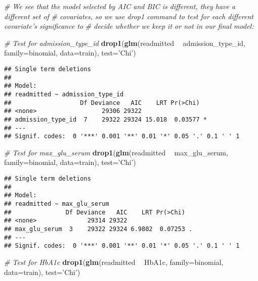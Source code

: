 \documentclass[
]{article}
\newenvironment{Shaded}{\begin{snugshade}}{\end{snugshade}}
\newcommand{\CommentTok}[1]{\textcolor[rgb]{0.56,0.35,0.01}{\textit{#1}}}
\newcommand{\DataTypeTok}[1]{\textcolor[rgb]{0.13,0.29,0.53}{#1}}
\newcommand{\KeywordTok}[1]{\textcolor[rgb]{0.13,0.29,0.53}{\textbf{#1}}}
\newcommand{\NormalTok}[1]{#1}
\newcommand{\OperatorTok}[1]{\textcolor[rgb]{0.81,0.36,0.00}{\textbf{#1}}}
\newcommand{\StringTok}[1]{\textcolor[rgb]{0.31,0.60,0.02}{#1}}
\begin{document}
\begin{Shaded}
\begin{Highlighting}[]
\CommentTok{# We see that the model selected by AIC and BIC is different, they have a different set of }
\CommentTok{# covariates, so we use drop1 command to test for each different covariate's significance to}
\CommentTok{# decide whether we keep it or not in our final model:}

\CommentTok{# Test for admission_type_id}
\KeywordTok{drop1}\NormalTok{(}\KeywordTok{glm}\NormalTok{(readmitted }\OperatorTok{~}\StringTok{ }\NormalTok{admission_type_id, }\DataTypeTok{family=}\NormalTok{binomial, }\DataTypeTok{data=}\NormalTok{train), }\DataTypeTok{test=}\StringTok{'Chi'}\NormalTok{)}
\end{Highlighting}
\end{Shaded}

\begin{verbatim}
## Single term deletions
## 
## Model:
## readmitted ~ admission_type_id
##                   Df Deviance   AIC    LRT Pr(>Chi)  
## <none>                  29306 29322                  
## admission_type_id  7    29322 29324 15.018  0.03577 *
## ---
## Signif. codes:  0 '***' 0.001 '**' 0.01 '*' 0.05 '.' 0.1 ' ' 1
\end{verbatim}

\begin{Shaded}
\begin{Highlighting}[]
\CommentTok{# Test for max_glu_serum}
\KeywordTok{drop1}\NormalTok{(}\KeywordTok{glm}\NormalTok{(readmitted }\OperatorTok{~}\StringTok{ }\NormalTok{max_glu_serum, }\DataTypeTok{family=}\NormalTok{binomial, }\DataTypeTok{data=}\NormalTok{train), }\DataTypeTok{test=}\StringTok{'Chi'}\NormalTok{)}
\end{Highlighting}
\end{Shaded}

\begin{verbatim}
## Single term deletions
## 
## Model:
## readmitted ~ max_glu_serum
##               Df Deviance   AIC    LRT Pr(>Chi)  
## <none>              29314 29322                  
## max_glu_serum  3    29322 29324 6.9802  0.07253 .
## ---
## Signif. codes:  0 '***' 0.001 '**' 0.01 '*' 0.05 '.' 0.1 ' ' 1
\end{verbatim}

\begin{Shaded}
\begin{Highlighting}[]
\CommentTok{# Test for HbA1c}
\KeywordTok{drop1}\NormalTok{(}\KeywordTok{glm}\NormalTok{(readmitted }\OperatorTok{~}\StringTok{ }\NormalTok{HbA1c, }\DataTypeTok{family=}\NormalTok{binomial, }\DataTypeTok{data=}\NormalTok{train), }\DataTypeTok{test=}\StringTok{'Chi'}\NormalTok{)}
\end{Highlighting}
\end{Shaded}
\end{document}
